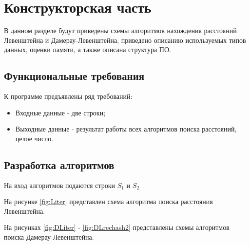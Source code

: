 \chapter{Конструкторская часть}

В данном разделе будут приведены схемы алгоритмов нахождения расстояний Левенштейна и Дамерау-Левенштейна, приведено описанию используемых типов данных, оценки памяти, а также описана структура ПО.

\section {Функциональные требования}

К программе предъявлены ряд требований:

\begin{itemize}
	\item Входные данные - две строки;
	\item Выходные данные - результат работы всех алгоритмов поиска расстояний, целое число.
\end{itemize}

\section{Разработка алгоритмов}

На вход алгоритмов подаются строки $S_1$ и $S_2$

На рисунке \ref{fig:Liter} представлен схема алгоритма поиска расстояния Левенштейна.

На рисунках \ref{fig:DLiter} - \ref{fig:DLrechash2} представлены схемы алгоритмов поиска Дамерау-Левенштейна.


